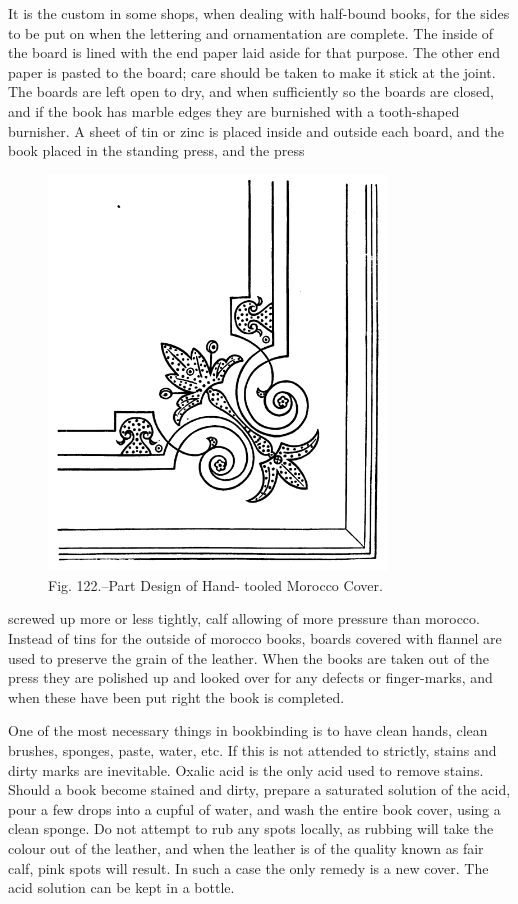 \documentclass[twoside]{book}
\begin{document}
It is the custom in some shops, when dealing with
half-bound books, for the sides to be put on when
the lettering and ornamentation are complete. The
inside of the board is lined with the end paper laid
aside for that purpose. The other end paper is
pasted to the board; care should be taken to make
it stick at the joint. The boards are left open to
\pagebreak
dry, and when sufficiently so the boards are closed,
and if the book has marble edges they are burnished
with a tooth-shaped burnisher. A sheet of tin or
zinc is placed inside and outside each board, and
the book placed in the standing press, and the press
	\begin{figure}[h]
		\centering
		\includegraphics[width=0.8\textwidth]{Figures/_122.png}
		\caption*{Fig. 122.--Part Design of Hand- tooled Morocco Cover.}
	\end{figure}
screwed up more or less tightly, calf allowing of
more pressure than morocco. Instead of tins for
the outside of morocco books, boards covered with
flannel are used to preserve the grain of the leather.
When the books are taken out of the press they are
polished up and looked over for any defects or
\pagebreak
finger-marks, and when these have been put right
the book is completed.

One of the most necessary things in bookbinding
is to have clean hands, clean brushes, sponges,
paste, water, etc. If this is not attended to strictly,
stains and dirty marks are inevitable. Oxalic acid
is the only acid used to remove stains. Should a
book become stained and dirty, prepare a saturated
solution of the acid, pour a few drops into a
cupful of water, and wash the entire book cover,
using a clean sponge. Do not attempt to rub any
spots locally, as rubbing will take the colour out
of the leather, and when the leather is of the quality
known as fair calf, pink spots will result. In such a
case the only remedy is a new cover. The acid
solution can be kept in a bottle.
\end{document}
